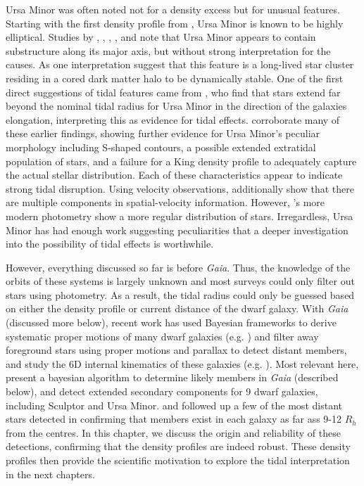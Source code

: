 Ursa Minor was often noted not for a density excess but for unusual
features. Starting with the first density profile from
\citet{hodge1964}, Ursa Minor is known to be highly elliptical. Studies
by \citet{olszewski+aaronson1985}, \citet{demers+1995}, \citet{IH1995},
\citet{kleyna+1998}, and \citet{bellazzini+2002} note that Ursa Minor
appears to contain substructure along its major axis, but without strong
interpretation for the causes. As one interpretation \citet{kleyna+2003}
suggest that this feature is a long-lived star cluster residing in a
cored dark matter halo to be dynamically stable. One of the first direct
suggestions of tidal features came from \citet{martinez-delgado+2001},
who find that stars extend far beyond the nominal tidal radius for Ursa
Minor in the direction of the galaxies elongation, interpreting this as
evidence for tidal effects. \citet{palma+2003} corroborate many of these
earlier findings, showing further evidence for Ursa Minor's peculiar
morphology including S-shaped contours, a possible extended extratidal
population of stars, and a failure for a King density profile to
adequately capture the actual stellar distribution. Each of these
characteristics appear to indicate strong tidal disruption. Using
velocity observations, \citet{pace+2014} additionally show that there
are multiple components in spatial-velocity information. However,
\citet{munoz+2018}'s more modern photometry show a more regular
distribution of stars. Irregardless, Ursa Minor has had enough work
suggesting peculiarities that a deeper investigation into the
possibility of tidal effects is worthwhile.

However, everything discussed so far is before \emph{Gaia}. Thus, the
knowledge of the orbits of these systems is largely unknown and most
surveys could only filter out stars using photometry. As a result, the
tidal radius could only be guessed based on either the density profile
or current distance of the dwarf galaxy. With \emph{Gaia} (discussed
more below), recent work has used Bayesian frameworks to derive
systematic proper motions of many dwarf galaxies (e.g. \citet{MV2020a})
and filter away foreground stars using proper motions and parallax to
detect distant members, and study the 6D internal kinematics of these
galaxies (e.g. \citet{tolstoy+2023}). Most relevant here,
\citet{jensen+2024} present a bayesian algorithm to determine likely
members in \emph{Gaia} (described below), and detect extended secondary
components for 9 dwarf galaxies, including Sculptor and Ursa Minor.
\citet{sestito+2023a} and \citet{sestito+2023b} followed up a few of the
most distant stars detected in \citet{jensen+2024} confirming that
members exist in each galaxy as far ass 9-12 \(R_h\) from the centres.
In this chapter, we discuss the origin and reliability of these
detections, confirming that the density profiles are indeed robust.
These density profiles then provide the scientific motivation to explore
the tidal interpretation in the next chapters.

